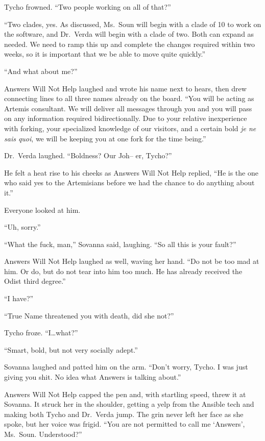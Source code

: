 Tycho frowned. ``Two people working on all of that?''

``Two clades, yes. As discussed, Ms.~Soun will begin with a clade of 10 to work on the software, and Dr.~Verda will begin with a clade of two. Both can expand as needed. We need to ramp this up and complete the changes required within two weeks, so it is important that we be able to move quite quickly.''

``And what about me?''

Answers Will Not Help laughed and wrote his name next to hears, then drew connecting lines to all three names already on the board. ``You will be acting as Artemis consultant. We will deliver all messages through you and you will pass on any information required bidirectionally. Due to your relative inexperience with forking, your specialized knowledge of our visitors, and a certain bold \emph{je ne sais quoi}, we will be keeping you at one fork for the time being.''

Dr.~Verda laughed. ``Boldness? Our Joh-- er, Tycho?''

He felt a heat rise to his cheeks as Answers Will Not Help replied, ``He is the one who said yes to the Artemisians before we had the chance to do anything about it.''

Everyone looked at him.

``Uh, sorry.''

``What the fuck, man,'' Sovanna said, laughing. ``So all this is your fault?''

Answers Will Not Help laughed as well, waving her hand. ``Do not be too mad at him. Or do, but do not tear into him too much. He has already received the Odist third degree.''

``I have?''

``True Name threatened you with death, did she not?''

Tycho froze. ``I\ldots what?''

``Smart, bold, but not very socially adept.''

Sovanna laughed and patted him on the arm. ``Don't worry, Tycho. I was just giving you shit. No idea what Answers is talking about.''

Answers Will Not Help capped the pen and, with startling speed, threw it at Sovanna. It struck her in the shoulder, getting a yelp from the Ansible tech and making both Tycho and Dr.~Verda jump. The grin never left her face as she spoke, but her voice was frigid. ``You are not permitted to call me `Answers', Ms.~Soun. Understood?''

